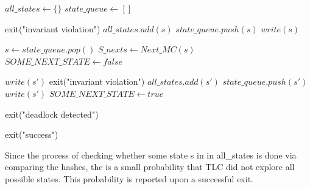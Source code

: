 \begin{algorithm}
\caption{Model-checking with TLC}

\begin{algorithmic}[1]

\STATE $all\_states \gets \{\}$
\STATE $state\_queue \gets []$



            \STATE exit("invariant violation")
        \ENDIF
        \STATE $all\_states.add(s)$
        \STATE $state\_queue.push(s)$
        \STATE $write(s)$
    \ENDIF
\ENDFOR



    \STATE $s \gets state\_queue.pop()$
    \STATE $S\_nexts \gets Next\_MC(s)$
    \STATE $SOME\_NEXT\_STATE \gets false$

					\STATE $write(s')$
                    \STATE exit("invariant violation")
                \ELSE
                    \STATE $all\_states.add(s')$
                    \STATE $state\_queue.push(s')$
                    \STATE $write(s')$
                \ENDIF
            \ENDIF
            \STATE $SOME\_NEXT\_STATE \gets true$
        \ENDIF
    \ENDFOR

        \STATE exit("deadlock detected")
    \ENDIF
\ENDWHILE

\STATE exit("success")


\end{algorithmic}
\end{algorithm}

Since the process of checking whether some state s in in all\_states is done via comparing the hashes, the is a small probability that TLC did not explore all possible states. This probability is reported upon a successful exit.